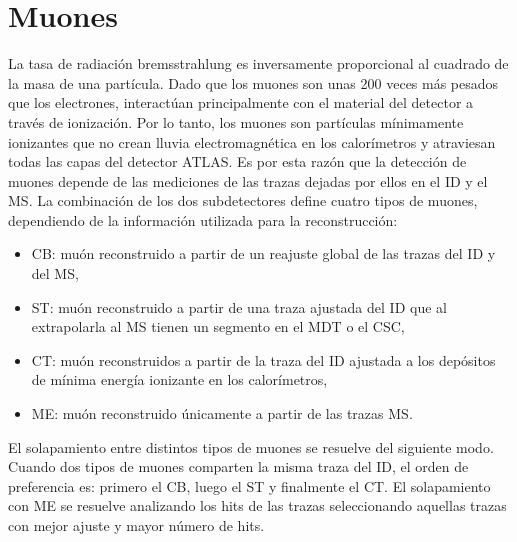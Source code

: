 \section{Muones}



La tasa de radiación bremsstrahlung es inversamente proporcional al cuadrado de la masa de una partícula. Dado que los muones son unas 200 veces más pesados que los electrones, interactúan principalmente con el material del detector a través de ionización. Por lo tanto, los muones son partículas mínimamente ionizantes que no crean lluvia electromagnética en los calorímetros y atraviesan todas las capas del detector \ac{ATLAS}. Es por esta razón que la detección de muones depende de las mediciones de las trazas dejadas por ellos en el \ac{ID} y el \ac{MS}. La combinación de los dos subdetectores define cuatro tipos de muones, dependiendo de la información utilizada para la reconstrucción:
\begin{itemize}
    \item \ac{CB}: muón reconstruido a partir de un reajuste global de las trazas del \ac{ID} y del \ac{MS},
    \item \ac{ST}: muón reconstruido a partir de una traza ajustada del \ac{ID} que al extrapolarla al \ac{MS} tienen un segmento en el \ac{MDT} o el \ac{CSC},
    \item \ac{CT}: muón reconstruidos a partir de la traza del \ac{ID} ajustada a los depósitos de mínima energía ionizante en los calorímetros,
    \item \ac{ME}: muón reconstruido únicamente a partir de las trazas \ac{MS}.
\end{itemize}

El solapamiento entre distintos tipos de muones se resuelve del siguiente modo. Cuando dos tipos de muones comparten la misma traza del \ac{ID}, el orden de preferencia es: primero el \ac{CB}, luego el \ac{ST} y finalmente el \ac{CT}. El solapamiento con \ac{ME} se resuelve analizando los hits de las trazas seleccionando aquellas trazas con mejor ajuste y mayor número de hits.

